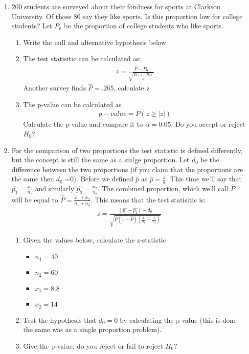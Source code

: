 \begin{enumerate}
\item 200 students are surveyed about their fondness for sports at Clarkson University. Of those 80 say they like sports. Is this proportion low for college students? Let $P_{0}$ be the proportion of college students who like sports.
\begin{enumerate}
\item Write the null and alternative hypothesis below
\item The test statisitic can be calculated as:
\begin{eqnarray*}
z=\frac{\hat{P}-P_{0}}{\sqrt{\frac{P_{0}(1-P_{0})}{n}}}
\end{eqnarray*}
Another survey finds $\hat{P} = .265$, calculate z
\item The p-value can be calculated as
\begin{eqnarray*}
p-value = P(z \ge |z|)
\end{eqnarray*}
Calculate the p-value and compare it to $\alpha = 0.05$. Do you accept or reject $H_{0}$?
\end{enumerate}
\item For the comparison of two proportions the test statistic is defined differently, but the concept is still the same as a sinlge proportion. Let $d_{0}$ be the difference between the two proportions (if you claim that the proportions are the same then $d_{0}$ =0). Before we defined $\hat{p}$ as $\hat{p}=\frac{x}{n}$. This time we'll say that $\hat{p_{1}} = \frac{x_{1}}{n_{1}}$ and similarly $\hat{p_{2}} = \frac{x_{2}}{n_{2}}$. The combined proportion, which we'll call $\hat{P}$ will be equal to $\hat{P} = \frac{x_{1}+x_{2}}{n_{1}+n_{2}}$. This means that the test statisitic is:
\begin{eqnarray*}
z=\frac{(\hat{p_{1}}-\hat{p_{2}})-d_{0}}{\sqrt{\hat{P}(1-\hat{P})\left(\frac{1}{n_{1}}+\frac{1}{n_{2}}\right)}}
\end{eqnarray*}
\begin{enumerate}
\item Given the values below, calculate the z-statistic
\begin{itemize}
\item $n_{1} = 40 $
\item $n_{2} = 60 $
\item $x_{1} = 8.8 $
\item $x_{2} = 14$
\end{itemize}
\item Test the hypothesis that $d_{0} = 0$ by calculating the p-value (this is done the same was as a single proportion problem).
\item Give the p-value, do you reject or fail to reject $H_{0}$?
\end{enumerate}
\end{enumerate}
